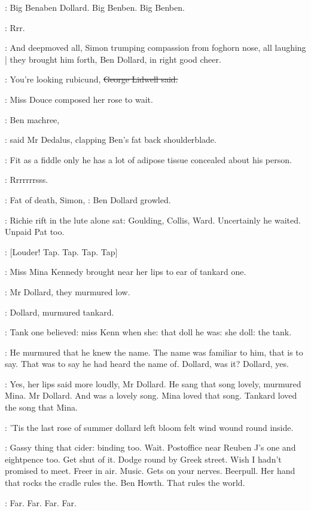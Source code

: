\BloomInt:
Big Benaben Dollard.
Big Benben.
Big Benben.

\BloomInt:
Rrr.

:
And deepmoved all,
Simon trumping compassion from foghorn nose,
all laughing |
they brought him forth,
Ben Dollard,
in right good cheer.

\lidwell:
You're looking rubicund,
\sout{George Lidwell said.}

:
Miss Douce composed her rose to wait.

\simon:
Ben machree,

:
said Mr Dedalus,
clapping Ben's fat back shoulderblade.

\simon:
Fit as a fiddle only he has a lot of adipose tissue concealed about his
person.

\BloomInt:
Rrrrrrrsss.

\dollard:
Fat of death,
Simon,
:
Ben Dollard growled.

:
Richie rift in the lute alone sat:
Goulding,
Collis,
Ward.
Uncertainly
he waited.
Unpaid Pat too.

\stripling:
[Louder!
Tap.
Tap.
Tap.
Tap]

:
Miss Mina Kennedy brought near her lips to ear of tankard one.

:
Mr Dollard,
they murmured low.

:
Dollard,
murmured tankard.

:
Tank one believed:
miss Kenn when she:
that doll he was:
she doll:
the tank.

:
He murmured that he knew the name.
The name was familiar to him,
that is to say.
That was to say he had heard the name of.
Dollard,
was it?
Dollard,
yes.

:
Yes,
her lips said more loudly,
Mr Dollard.
He sang that song lovely,
murmured Mina.
Mr Dollard.
And
 was a lovely
song.
Mina loved that song.
Tankard loved the song that Mina.

:
'Tis the last rose of summer dollard left bloom felt wind wound round
inside.

\BloomInt:
Gassy thing that cider:
binding too.
Wait.
Postoffice near Reuben J's
one and eightpence too.
Get shut of it.
Dodge round by Greek street.
Wish
I hadn't promised to meet.
Freer in air.
Music.
Gets on your nerves.
Beerpull.
Her hand that rocks the cradle rules the.
Ben Howth.
That rules
the world.

:
Far.
Far.
Far.
Far.

